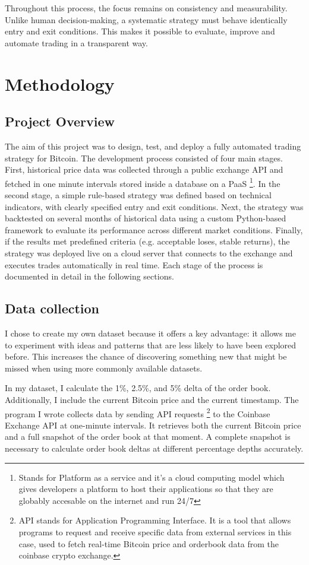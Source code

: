 \documentclass[12pt]{article}
\begin{document}
Throughout this process, the focus remains on consistency and measurability. Unlike human decision-making, a systematic strategy must behave identically entry and exit conditions. This makes it possible to evaluate, improve and automate trading in a transparent way.



\newpage
\section{Methodology}

\subsection{Project Overview}
The aim of this project was to design, test, and deploy a fully automated trading strategy for Bitcoin. The development process consisted of four main stages. First, historical price data was collected through a public exchange API and fetched in one minute intervals stored inside a database on a PaaS \footnote[1]{Stands for Platform as a service and it's a cloud computing model which gives developers a platform to host their applications so that they are globably accesable on the internet and run 24/7}. In the second stage, a simple rule-based strategy was defined based on technical indicators, with clearly specified entry and exit conditions. Next, the strategy was backtested on several months of historical data using a custom Python-based framework to evaluate its performance across different market conditions. Finally, if the results met predefined criteria (e.g. acceptable loses, stable returns), the strategy was deployed live on a cloud server that connects to the exchange and executes trades automatically in real time. Each stage of the process is documented in detail in the following sections.

\subsection{Data collection}




I chose to create my own dataset because it offers a key advantage: it allows me to experiment with ideas and patterns that are less likely to have been explored before. This increases the chance of discovering something new that might be missed when using more commonly available datasets.

In my dataset, I calculate the 1\%, 2.5\%, and 5\% delta of the order book. Additionally, I include the current Bitcoin price and the current timestamp. The program I wrote collects data by sending API requests \footnote[2]{API stands for Application Programming Interface. It is a tool that allows programs to request and receive specific data from external services in this case, used to fetch real-time Bitcoin price and orderbook data from the coinbase crypto exchange.} to the Coinbase Exchange API at one-minute intervals. It retrieves both the current Bitcoin price and a full snapshot of the order book at that moment. A complete snapshot is necessary to calculate order book deltas at different percentage depths accurately.
\end{document}
